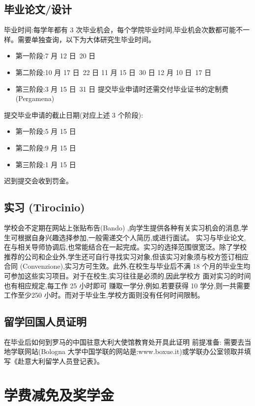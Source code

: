 \documentclass[3pt,a5paper,openright,twoside]{book}
\begin{document}
\subsection{毕业论文/设计}

毕业时间:每学年都有 3 次毕业机会，每个学院毕业时间,毕业机会次数都可能不一样。需要单独查询，以下为大体研究生毕业时间。
\begin{itemize}
\item 第一阶段:7 月 12 日~20 日
\item 第二阶段:10 月 17 日~22 日 11 月 15 日~30 日 12 月 10 日~17 日
\item 第三阶段:3 月 15 日~31 日
提交毕业申请时还需交付毕业证书的定制费 (Pergamena) 
\end{itemize}

\noindent 提交毕业申请的截止日期(对应上述 3 个阶段): 
\begin{itemize}
\item 第一阶段:5 月 15 日
\item 第二阶段:9 月 15 日
\item 第三阶段:1 月 15 日 
\end{itemize}
迟到提交会收到罚金。

\subsection{实习 (Tirocinio)}
学校会不定期在网站上张贴布告(Bando) ,向学生提供各种有关实习机会的消息,学生可根据自身兴趣选择参加,一般需递交个人简历,或进行面试。 实习与毕业论文,在与相关导师协调后,也常能结合在一起完成。实习的选择范围很宽泛。除了学校推荐的公司和企业外,学生还可自行寻找实习对象,但该实习对象须与校方签订相应合同 (Convenzione),实习方可生效。此外,在校生与毕业后不满 18 个月的毕业生均可参加这些实习项目。对于在校生,实习往往是必须的,因此学校方 面对实习的时间也有相应规定,每工作 25 小时即可 
赚取一学分,例如,若要获得 10 学分,则一共需要工作至少250 小时。而对于毕业生,学校方面则没有任何时间限制。 
\subsection{留学回国人员证明}
在毕业后如何到罗马的中国驻意大利大使馆教育处开具此证明 
前提准备: 需要去当地学联网站(Bologna 大学中国学联的网站是:www.boxue.it)或学联办公室领取并填写《赴意大利留学人员登记表》。

\section{学费减免及奖学金}
\end{document}
